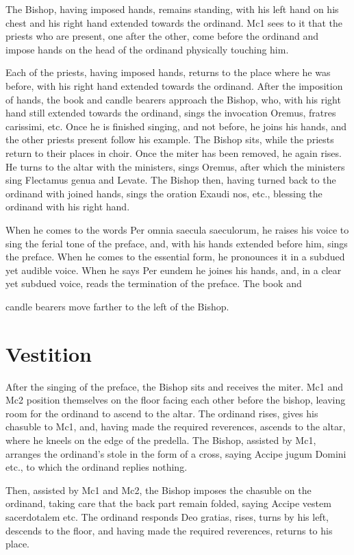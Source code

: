 \documentclass{report}
\begin{document}
{	The Bishop, having imposed hands, remains standing, with his left hand on
	his chest and his right hand extended towards the ordinand. Mc1 sees to it
	that the priests who are present, one after the other, come before the
	ordinand and impose hands on the head of the ordinand physically touching
	him.

	Each of the priests, having imposed hands, returns to the place where he
	was before, with his right hand extended towards the ordinand. After the
	imposition of hands, the book and candle bearers approach the Bishop, who,
	with his right hand still extended towards the ordinand, sings the
	invocation Oremus, fratres carissimi, etc. Once he is finished singing, and
	not before, he joins his hands, and the other priests present follow his
	example. The Bishop sits, while the priests return to their places in
	choir. Once the miter has been removed, he again rises. He turns to the
	altar with the ministers, sings Oremus, after which the ministers sing
	Flectamus genua and Levate. The Bishop then, having turned back to the
	ordinand with joined hands, sings the oration Exaudi nos, etc., blessing
	the ordinand with his right hand.

	When he comes to the words Per omnia saecula saeculorum, he raises his
	voice to sing the ferial tone of the preface, and, with his hands extended
	before him, sings the preface. When he comes to the essential form, he
	pronounces it in a subdued yet audible voice. When he says Per eundem he
	joines his hands, and, in a clear yet subdued voice, reads the termination
	of the preface. The book and

	candle bearers move farther to the left of the Bishop.

	\section{Vestition}

	After the singing of the preface, the Bishop sits and receives the miter.
	Mc1 and Mc2 position themselves on the floor facing each other before the
	bishop, leaving room for the ordinand to ascend to the altar. The ordinand
	rises, gives his chasuble to Mc1, and, having made the required reverences,
	ascends to the altar, where he kneels on the edge of the predella. The
	Bishop, assisted by Mc1, arranges the ordinand’s stole in the form of a
	cross, saying Accipe jugum Domini etc., to which the ordinand replies
	nothing.

	Then, assisted by Mc1 and Mc2, the Bishop imposes the chasuble on the
	ordinand, taking care that the back part remain folded, saying Accipe
	vestem sacerdotalem etc. The ordinand responds Deo gratias, rises, turns by
	his left, descends to the floor, and having made the required reverences,
	returns to his place.

}
\end{document}
